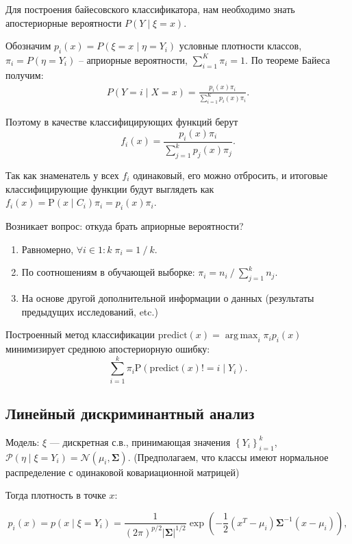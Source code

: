 \documentclass{article}
\DeclareMathOperator*{\argmax}{arg\,max}
\begin{document}
	Для построения байесовского классификатора, нам необходимо знать апостериорные вероятности $P(Y \mid \xi = x)$.
	
	Обозначим $p_i(x) = P(\xi = x \mid \eta =Y_i)$ условные плотности классов, $\pi_i = P(\eta = Y_i)$ -- априорные вероятности, $\sum_{i = 1}^{K} \pi_i = 1$. По теореме Байеса получим:
	\begin{align*}
		P(Y = i \mid X = x) = \frac{p_i(x) \pi_i}{\sum_{i = 1}^K p_i(x)\pi_i}.
	\end{align*}
	
	Поэтому в качестве классифицирующих функций берут
	$$f_i\left(x\right) = \frac{p_i(x) \pi_i}{\sum_{j=1}^k p_j(x) \pi_j}. $$
	
	Так как знаменатель у всех $f_i$ одинаковый, его можно отбросить, и итоговые классифицирующие функции будут выглядеть как $f_i\left(x\right) = \mathrm P\left(x\middle\vert C_i\right) \pi_i = p_i(x) \pi_i$.
	
	Возникает вопрос: откуда брать априорные вероятности?
	\begin{enumerate}
		\item Равномерно, $\forall i \in 1\mathbin : k \; \pi_i = 1 \mathbin / k$.
		\item По соотношениям в обучающей выборке: $\pi_i = n_i \mathbin / \sum_{j=1}^k n_j$.
		\item На основе другой дополнительной информации о данных (результаты предыдущих исследований, etc.)
	\end{enumerate}

	Построенный метод классификации $\mathrm{predict}(x) = \argmax_i \pi_i p_i(x)$ минимизирует среднюю апостериорную ошибку:
	$$\sum_{i=1}^k \pi_i \mathrm P(\mathrm{predict}(x) != i\mid Y_i).$$
	
	\subsection{Линейный дискриминантный анализ}
	
	Модель: $\xi$ --- дискретная с.в., принимающая значения $\left\lbrace Y_i\right\rbrace_{i=1}^k$, $\mathcal P(\eta\mid \xi = Y_i) = \mathcal N (\mu_i, \mathbf\Sigma)$.  (Предполагаем, что классы имеют нормальное распределение с одинаковой ковариационной матрицей)
	
	Тогда плотность в точке $x$:
	
	$$p_i(x) = p\left(x\middle\vert \xi = Y_i\right) = \frac{1}{\left(2\pi\right)^{p/2}\left\vert\bm{\Sigma}\right\vert^{1/2}} \exp\left(-\frac{1}{2}{\left(x^T -\mu_i\right)}\bm{\Sigma}^{-1}\left(x -\mu_i\right)\right),$$
	
\end{document}
